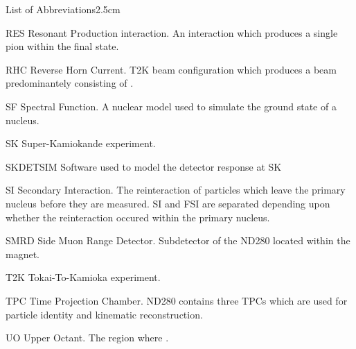 \begin{mclistof}{List of Abbreviations}{2.5cm}
\item[RES]Resonant Production interaction. An interaction which produces a single pion within the final state.
\item[RHC]Reverse Horn Current. T2K beam configuration which produces a beam predominantely consisting of \quickmath{\bar{\nu}_\mu}.
\item[SF]Spectral Function. A nuclear model used to simulate the ground state of a nucleus.
\item[SK]Super-Kamiokande experiment.
\item[SKDETSIM]Software used to model the detector response at SK
\item[SI]Secondary Interaction. The reinteraction of particles which leave the primary nucleus before they are measured. SI and FSI are separated depending upon whether the reinteraction occured within the primary nucleus.
\item[SMRD]Side Muon Range Detector. Subdetector of the ND280 located within the magnet.
\item[T2K]Tokai-To-Kamioka experiment.
\item[TPC]Time Projection Chamber. ND280 contains three TPCs which are used for particle identity and kinematic reconstruction.
\item[UO]Upper Octant. The region where .

\end{mclistof} 
